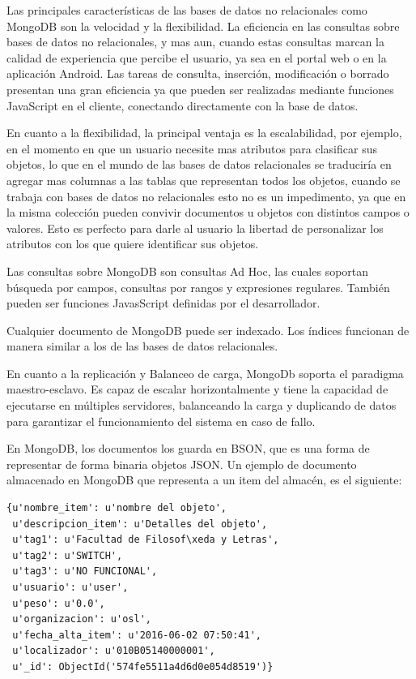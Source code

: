 \documentclass[a4paper,11pt]{book}
\begin{document}
Las principales características de las bases de datos no relacionales como MongoDB son la velocidad y la flexibilidad. La eficiencia en las consultas sobre bases de datos no relacionales, y mas aun, cuando estas consultas marcan la calidad de experiencia que percibe el usuario, ya sea en el portal web o en la aplicación Android.  Las tareas de consulta, inserción, modificación o borrado presentan una gran eficiencia ya que pueden ser realizadas mediante funciones JavaScript en el cliente, conectando directamente con la base de datos.

En cuanto a la flexibilidad, la principal ventaja es la escalabilidad, por ejemplo, en el momento en que un usuario necesite mas atributos para clasificar sus objetos, lo que en el mundo de las bases de datos relacionales se traduciría en agregar mas columnas a las tablas que representan todos los objetos, cuando se trabaja con bases de datos no relacionales esto no es un impedimento, ya que en la misma colección pueden convivir documentos u objetos con distintos campos o valores. Esto es perfecto para darle al usuario la libertad de personalizar los atributos con los que quiere identificar sus objetos. 

Las consultas sobre MongoDB son consultas Ad Hoc, las cuales soportan búsqueda por campos, consultas por rangos y expresiones regulares. También pueden ser funciones JavasScript definidas por el desarrollador. 

Cualquier documento de MongoDB puede ser indexado. Los índices funcionan de manera similar a los de las bases de datos relacionales. 

En cuanto a la replicación y Balanceo de carga, MongoDb soporta el paradigma maestro-esclavo. Es capaz de escalar horizontalmente y tiene la capacidad de ejecutarse en múltiples servidores, balanceando la carga y duplicando de datos para garantizar el funcionamiento del sistema en caso de fallo. 

En MongoDB, los documentos los guarda en BSON, que es una forma de representar de forma binaria objetos JSON. Un ejemplo de documento almacenado en MongoDB que representa a un item del almacén, es el siguiente:

\begin{lstlisting}
{u'nombre_item': u'nombre del objeto', 
 u'descripcion_item': u'Detalles del objeto', 
 u'tag1': u'Facultad de Filosof\xeda y Letras',
 u'tag2': u'SWITCH',
 u'tag3': u'NO FUNCIONAL',
 u'usuario': u'user',
 u'peso': u'0.0',
 u'organizacion': u'osl',
 u'fecha_alta_item': u'2016-06-02 07:50:41',
 u'localizador': u'010B05140000001',
 u'_id': ObjectId('574fe5511a4d6d0e054d8519')}

\end{lstlisting}
\end{document}
